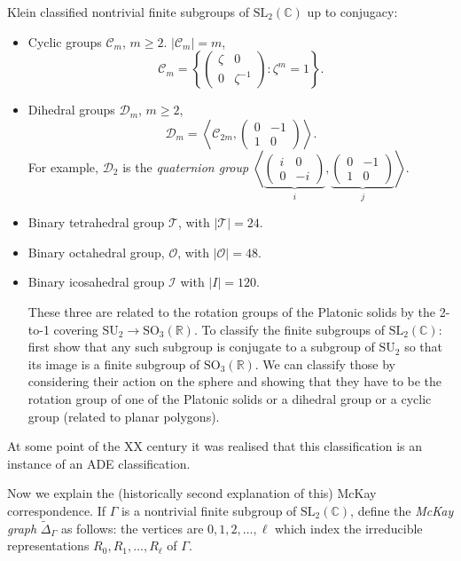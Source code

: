 \noindent
Klein classified nontrivial finite subgroups
of $\text{SL}_2(\mathbb{C})$
up to conjugacy:
\begin{itemize}
\item Cyclic groups $\mathcal{C}_m$, $m \geq
2$. $|\mathcal{C}_m|=m$,
$$
\mathcal{C}_m=\left\{\begin{pmatrix}
\zeta&0\\
0&\zeta^{-1}\end{pmatrix}:\zeta^m=1
\right\}.
$$
\item Dihedral groups $\mathcal{D}_m$, $m\geq
2$,
$$
\mathcal{D}_m=\left\langle{}\mathcal{C}_{2m},
\begin{pmatrix}
0&-1\\
1&0
\end{pmatrix}\right\rangle{}.
$$
For example, $\mathcal{D}_2$ is the {\it
quaternion group}
$\left\langle{}\underbrace{\begin{pmatrix}
i&0\\
0&-i
\end{pmatrix}}_{i},
\underbrace{\begin{pmatrix}
0&-1\\
1&0
\end{pmatrix}}_{j}\right\rangle{}$.

\item Binary tetrahedral group $\mathcal{T}$,
with $|\mathcal{T}|=24$.
\item Binary octahedral group, $\mathcal{O}$,
with $|\mathcal{O}|=48$.
\item Binary icosahedral group $\mathcal{I}$
with $|I|=120$.

These three are related to the rotation
groups of the
Platonic solids by the 2-to-1 covering
$\text{SU}_2 \to \text{SO}_3(\mathbb{R})$.
To classify the finite subgroups of
$\text{SL}_2(\mathbb{C})$:
first show that any such subgroup is
conjugate to a subgroup
of $\text{SU}_2$ so that its image is a
finite subgroup of
$\text{SO}_3(\mathbb{R})$. We can classify
those by considering their
action on the sphere and showing that they
have to be the
rotation group of one of the Platonic solids
or a dihedral group
or a cyclic group (related to planar
polygons).
\end{itemize}

\noindent
At some point of the XX century it was
realised that this
classification is an instance of an ADE
classification.

Now we explain the (historically second
explanation of this) McKay
correspondence.
If $\Gamma$ is a nontrivial finite subgroup
of $\text{SL}_2(\mathbb{C})$,
define the  {\it McKay graph}
$\tilde{\Delta}_\Gamma$ as follows:
the vertices are $0,1,2,\ldots,\ell$ which
index the
irreducible representations
$R_0,R_1,\ldots,R_\ell$ of $\Gamma$.

